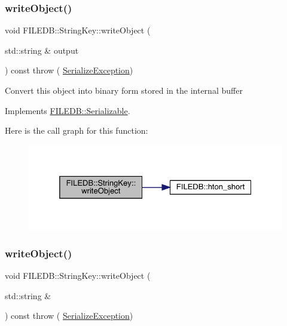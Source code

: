 \mbox{\label{classFILEDB_1_1StringKey_a29db7eea425c851c5e0a4336d7a85fb1}} 
\subsubsection{\texorpdfstring{writeObject()}{writeObject()}\hspace{0.1cm}{\footnotesize\ttfamily [1/2]}}
{\footnotesize\ttfamily void F\+I\+L\+E\+D\+B\+::\+String\+Key\+::write\+Object (\begin{DoxyParamCaption}\item[{std\+::string \&}]{output }\end{DoxyParamCaption}) const throw ( \mbox{\hyperlink{classFILEDB_1_1SerializeException}{Serialize\+Exception}}) \hspace{0.3cm}{\ttfamily [virtual]}}

Convert this object into binary form stored in the internal buffer 

Implements \mbox{\hyperlink{classFILEDB_1_1Serializable_a8deaa86e108c08c863881e46cf5578ea}{F\+I\+L\+E\+D\+B\+::\+Serializable}}.

Here is the call graph for this function\+:\nopagebreak
\begin{figure}[H]
\begin{center}
\leavevmode
\includegraphics[width=325pt]{d2/da7/classFILEDB_1_1StringKey_a29db7eea425c851c5e0a4336d7a85fb1_cgraph}
\end{center}
\end{figure}
\mbox{\label{classFILEDB_1_1StringKey_a29db7eea425c851c5e0a4336d7a85fb1}} 
\subsubsection{\texorpdfstring{writeObject()}{writeObject()}\hspace{0.1cm}{\footnotesize\ttfamily [2/2]}}
{\footnotesize\ttfamily void F\+I\+L\+E\+D\+B\+::\+String\+Key\+::write\+Object (\begin{DoxyParamCaption}\item[{std\+::string \&}]{ }\end{DoxyParamCaption}) const throw ( \mbox{\hyperlink{classFILEDB_1_1SerializeException}{Serialize\+Exception}}) \hspace{0.3cm}{\ttfamily [virtual]}}

